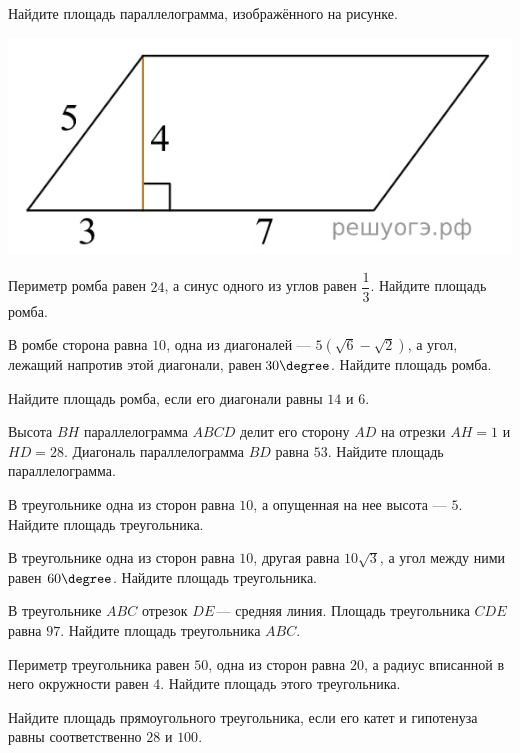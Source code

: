 \begin{class}[number=7]
\begin{listofex}
		\begin{minipage}[t]{0.57\textwidth}
			Найдите площадь параллелограмма, изображённого на рисунке.
		\end{minipage}
		\begin{minipage}[c]{0.3\textwidth}
			\includegraphics[align=t, width=\textwidth]{pics/G91M4L7-2}
		\end{minipage}
		\item Периметр ромба равен \( 24 \), а синус одного из углов равен \( \dfrac{1}{3} \). Найдите площадь ромба.
		\item В ромбе сторона равна \( 10 \), одна из диагоналей --- \( 5(\sqrt{6}-\sqrt{2})\), а угол, лежащий напротив этой диагонали, равен \( 30\degree \). Найдите площадь ромба.
		\item Найдите площадь ромба, если его диагонали равны \( 14 \) и \( 6 \).
		\item Высота \( BH \) параллелограмма \( ABCD \) делит его сторону \( AD \) на отрезки \( AH  =  1 \) и \( HD  =  28 \). Диагональ параллелограмма \( BD \) равна \( 53 \). Найдите площадь параллелограмма.
		\item В треугольнике одна из сторон равна \( 10 \), а опущенная на нее высота --- \( 5 \). Найдите площадь треугольника.
		\item В треугольнике одна из сторон равна \( 10 \), другая равна \( 10 \sqrt{3} \), а угол между ними равен \( 60\degree \). Найдите площадь треугольника.
		\item В треугольнике \( ABC \) отрезок \( DE \) --- средняя линия. Площадь треугольника \( CDE \) равна \( 97 \). Найдите площадь треугольника \( ABC \).
		\item Периметр треугольника равен \( 50 \), одна из сторон равна \( 20 \), а радиус вписанной в него окружности равен \( 4 \). Найдите площадь этого треугольника.
		\item Найдите площадь прямоугольного треугольника, если его катет и гипотенуза равны соответственно \( 28 \) и \( 100 \).

\end{listofex}
\end{class}
